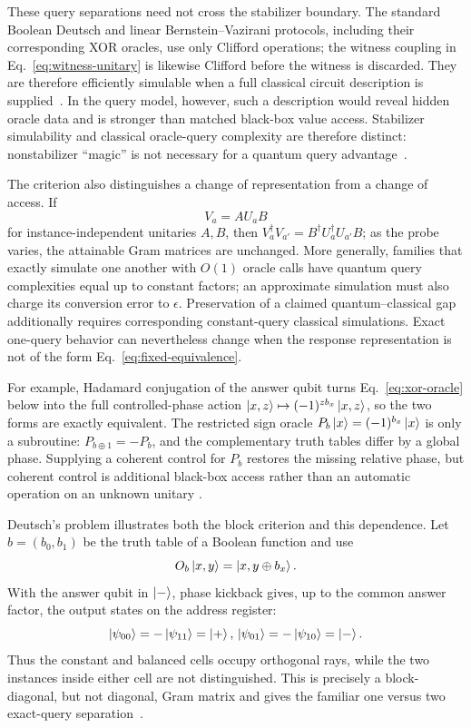 \documentclass[
  aps,
  prl,
  reprint,
  nofootinbib
]{revtex4-2}
\begin{document}
These query separations need not cross the stabilizer boundary. The standard
Boolean Deutsch and linear Bernstein--Vazirani protocols, including their
corresponding XOR oracles, use only Clifford operations; the witness coupling
in Eq.~\eqref{eq:witness-unitary} is likewise Clifford before the witness is
discarded. They are therefore efficiently simulable when a full classical
circuit description is supplied~\cite{GottesmanKnill,AaronsonGottesman2004}.
In the query model, however, such a description would reveal hidden oracle
data and is stronger than matched black-box value access. Stabilizer
simulability and classical oracle-query complexity are therefore distinct:
nonstabilizer ``magic'' is not necessary for a quantum query
advantage~\cite{Veitch2014}.

The criterion also distinguishes a change of representation from a change
of access. If
\begin{equation}
 V_a=A U_a B
 \label{eq:fixed-equivalence}
\end{equation}
for instance-independent unitaries \(A,B\), then
\(V_a^\dagger V_{a'}=B^\dagger U_a^\dagger U_{a'}B\); as the probe varies,
the attainable Gram matrices are unchanged. More generally, families that
exactly simulate one another with \(O(1)\) oracle calls have quantum query
complexities equal up to constant factors; an approximate simulation must
also charge its conversion error to \(\epsilon\). Preservation of a claimed
quantum--classical gap additionally requires corresponding constant-query
classical simulations. Exact one-query behavior can nevertheless change
when the response representation is not of the form
Eq.~\eqref{eq:fixed-equivalence}.

For example, Hadamard conjugation of the answer qubit turns
Eq.~\eqref{eq:xor-oracle} below into the full controlled-phase action
\(\ket{x,z}\mapsto(-1)^{z b_x}\ket{x,z}\), so the two forms are exactly
equivalent. The restricted sign oracle
\(P_b\ket x=(-1)^{b_x}\ket x\) is only a subroutine:
\(P_{b\oplus 1}=-P_b\), and the complementary truth tables differ by a
global phase. Supplying a coherent control for \(P_b\) restores the missing
relative phase, but coherent control is additional black-box access rather
than an automatic operation on an unknown unitary
\cite{AraujoFeixCostaBrukner2014}.

Deutsch's problem illustrates both the block criterion and this dependence.
Let \(b=(b_0,b_1)\) be the truth table of a Boolean function and use
\begin{equation}
 O_b\ket{x,y}=\ket{x,y\oplus b_x}.
 \label{eq:xor-oracle}
\end{equation}
With the answer qubit in \(\ket-\), phase kickback gives, up to the common
answer factor, the output states on the address register:
\begin{equation}
 \ket{\psi_{00}} = -\ket{\psi_{11}} = \ket{+},\,
 \ket{\psi_{01}} = -\ket{\psi_{10}} = \ket{-}.
 \label{eq:deutsch-rays}
\end{equation}
Thus the constant and balanced cells occupy orthogonal rays, while the two
instances inside either cell are not distinguished. This is precisely a
block-diagonal, but not diagonal, Gram matrix and gives the familiar one
versus two exact-query separation~\cite{deutsch}.
\end{document}
